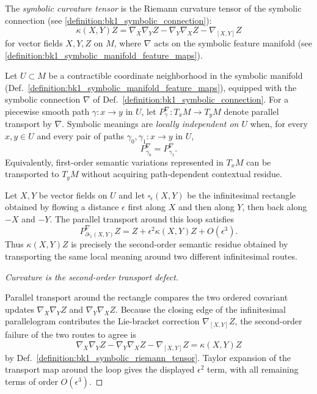 \begin{definition}
\label{definition:bk1_symbolic_riemann_tensor}
The \emph{symbolic curvature tensor} is the Riemann curvature tensor of the symbolic connection (see \ref{definition:bk1_symbolic_connection}):
\[
\kappa(X,Y)Z = \nabla_X \nabla_Y Z - \nabla_Y \nabla_X Z - \nabla_{[X,Y]} Z
\]
for vector fields $X, Y, Z$ on $M$, where $\nabla$ acts on the symbolic feature manifold (see \ref{definition:bk1_symbolic_manifold_feature_maps}).
\end{definition}

\begin{definition}
\label{definition:bk1_local_semantic_independence}
Let $U \subset M$ be a contractible coordinate neighborhood in the symbolic
manifold (Def.~\ref{definition:bk1_symbolic_manifold_feature_maps}), equipped
with the symbolic connection $\nabla$ of Def.~\ref{definition:bk1_symbolic_connection}.
For a piecewise smooth path $\gamma:x\to y$ in $U$, let
$P^\nabla_\gamma:T_xM\to T_yM$ denote parallel transport by $\nabla$.
Symbolic meanings are \emph{locally independent on $U$} when, for every
$x,y\in U$ and every pair of paths $\gamma_0,\gamma_1:x\to y$ in $U$,
\[
P^\nabla_{\gamma_0} = P^\nabla_{\gamma_1}.
\]
Equivalently, first-order semantic variations represented in $T_xM$ can be
transported to $T_yM$ without acquiring path-dependent contextual residue.
\end{definition}

\begin{lemma}
\label{lemma:bk1_curvature_semantic_holonomy}
Let $X,Y$ be vector fields on $U$ and let $\square_{\epsilon}(X,Y)$ be the
infinitesimal rectangle obtained by flowing a distance $\epsilon$ first along
$X$ and then along $Y$, then back along $-X$ and $-Y$. The parallel transport
around this loop satisfies
\[
P^\nabla_{\partial\square_{\epsilon}(X,Y)}Z
= Z + \epsilon^2 \kappa(X,Y)Z + O(\epsilon^3).
\]
Thus $\kappa(X,Y)Z$ is precisely the second-order semantic residue obtained by
transporting the same local meaning around two different infinitesimal routes.
\end{lemma}

\begin{proof}[Curvature is the second-order transport defect]
\label{proof:bk1_curvature_semantic_holonomy}
\leavevmode

Parallel transport around the rectangle compares the two ordered covariant
updates $\nabla_X\nabla_YZ$ and $\nabla_Y\nabla_XZ$. Because the closing edge of
the infinitesimal parallelogram contributes the Lie-bracket correction
$\nabla_{[X,Y]}Z$, the second-order failure of the two routes to agree is
\[
\nabla_X\nabla_YZ-\nabla_Y\nabla_XZ-\nabla_{[X,Y]}Z
=\kappa(X,Y)Z
\]
by Def.~\ref{definition:bk1_symbolic_riemann_tensor}. Taylor expansion of the
transport map around the loop gives the displayed
$\epsilon^2$ term, with all remaining terms of order $O(\epsilon^3)$.
\end{proof}

